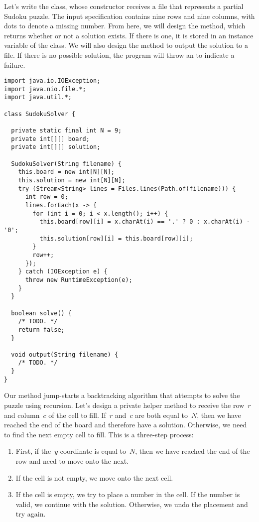 Let's write the  class, whose constructor receives a file that represents a partial Sudoku puzzle. 
The input specification contains nine rows and nine columns, with dots to denote a missing number. 
From here, we will design the  method, which returns whether or not a solution exists. 
If there is one, it is stored in an instance variable of the class. 
We will also design the  method to output the solution to a file. 
If there is no possible solution, the program will throw an  to indicate a failure.

\begin{lstlisting}[language=MyJava]
import java.io.IOException;
import java.nio.file.*;
import java.util.*;

class SudokuSolver {

  private static final int N = 9;
  private int[][] board;
  private int[][] solution;

  SudokuSolver(String filename) {
    this.board = new int[N][N];
    this.solution = new int[N][N];
    try (Stream<String> lines = Files.lines(Path.of(filename))) {
      int row = 0;
      lines.forEach(x -> {
        for (int i = 0; i < x.length(); i++) {
          this.board[row][i] = x.charAt(i) == '.' ? 0 : x.charAt(i) - '0';
          this.solution[row][i] = this.board[row][i];
        }
        row++;
      });
    } catch (IOException e) {
      throw new RuntimeException(e);
    }
  }

  boolean solve() { 
    /* TODO. */ 
    return false;  
  }

  void output(String filename) { 
    /* TODO. */ 
  }
}
\end{lstlisting}

Our  method jump-starts a backtracking algorithm that attempts to solve the puzzle using recursion. 
Let's design a private helper method to receive the row~$r$ and column~$c$ of the cell to fill. 
If~$r$ and~$c$ are both equal to~$N$, then we have reached the end of the board and therefore have a solution. 
Otherwise, we need to find the next empty cell to fill. 
This is a three-step process:

\begin{enumerate}[label=(\roman*)]
  \item First, if the~$y$ coordinate is equal to~$N$, then we have reached the end of the row and need to move onto the next.
  \item If the cell is not empty, we move onto the next cell.
  \item If the cell is empty, we try to place a number in the cell. If the number is valid, we continue with the solution. Otherwise, we undo the placement and try again.
\end{enumerate}

